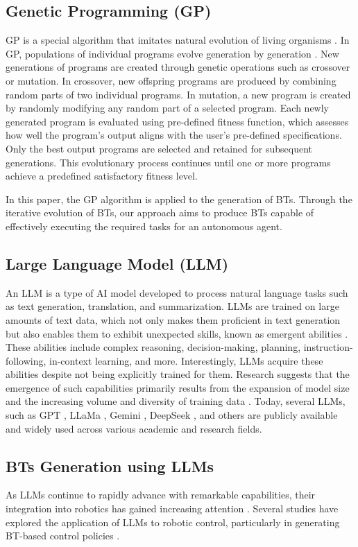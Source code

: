 \subsection{Genetic Programming (GP)}
GP is a special algorithm that imitates natural evolution of living organisms \cite{c20}. In GP, populations of individual programs evolve generation by generation \cite{c6,c20,c21,c22}. New generations of programs are created through genetic operations such as crossover or mutation. In crossover, new offspring programs are produced by combining random parts of two individual programs. In mutation, a new program is created by randomly modifying any random part of a selected program.  Each newly generated program is evaluated using pre-defined fitness function, which assesses how well the program’s output aligns with the user’s pre-defined specifications. Only the best output programs are selected and retained for subsequent generations. This evolutionary process continues until one or more programs achieve a predefined satisfactory fitness level.

In this paper, the GP algorithm is applied to the generation of BTs. Through the iterative evolution of BTs, our approach aims to produce BTs capable of effectively executing the required tasks for an autonomous agent.

\subsection{Large Language Model (LLM)}
An LLM is a type of AI model developed to process natural language tasks such as text generation, translation, and summarization. LLMs are trained on large amounts of text data, which not only makes them proficient in text generation but also enables them to exhibit unexpected skills, known as emergent abilities \cite{c23,c24,c25,c26,c27}. These abilities include complex reasoning, decision-making, planning, instruction-following, in-context learning, and more. Interestingly, LLMs acquire these abilities despite not being explicitly trained for them. Research suggests that the emergence of such capabilities primarily results from the expansion of model size and the increasing volume and diversity of training data \cite{c23,c24,c25,c26,c27}. Today, several LLMs, such as GPT \cite{c28}, LLaMa \cite{c29}, Gemini \cite{c30}, DeepSeek \cite{c31}, and others are publicly available and widely used across various academic and research fields.

\subsection{BTs Generation using LLMs}
As LLMs continue to rapidly advance with remarkable capabilities, their integration into robotics has gained increasing attention \cite{c23,c32}. Several studies have explored the application of LLMs to robotic control, particularly in generating BT-based control policies \cite{c7}. 

